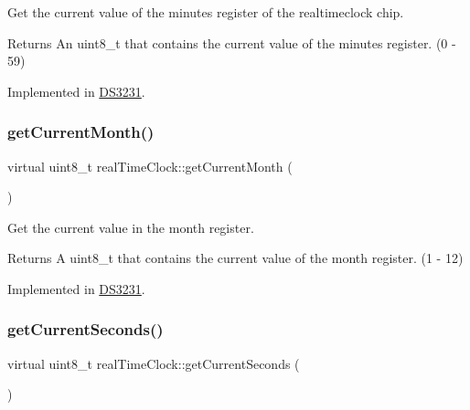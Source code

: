 Get the current value of the minutes register of the realtimeclock chip. 

\begin{DoxyReturn}{Returns}
An uint8\+\_\+t that contains the current value of the minutes register. (0 -\/ 59) 
\end{DoxyReturn}


Implemented in \mbox{\hyperlink{class_d_s3231_a08f384e1897214d4a201aaaecde3b8a4}{D\+S3231}}.

\mbox{\label{classreal_time_clock_a24dd15babb345129fd995641946c5f2b}} 
\subsubsection{\texorpdfstring{get\+Current\+Month()}{getCurrentMonth()}}
{\footnotesize\ttfamily virtual uint8\+\_\+t real\+Time\+Clock\+::get\+Current\+Month (\begin{DoxyParamCaption}{ }\end{DoxyParamCaption})\hspace{0.3cm}{\ttfamily [pure virtual]}}



Get the current value in the month register. 

\begin{DoxyReturn}{Returns}
A uint8\+\_\+t that contains the current value of the month register. (1 -\/ 12) 
\end{DoxyReturn}


Implemented in \mbox{\hyperlink{class_d_s3231_a8d7a965802afacc16b4d5af86e0ed11e}{D\+S3231}}.

\mbox{\label{classreal_time_clock_a46bfe69dc650cc27e648ac7adb03afd0}} 
\subsubsection{\texorpdfstring{get\+Current\+Seconds()}{getCurrentSeconds()}}
{\footnotesize\ttfamily virtual uint8\+\_\+t real\+Time\+Clock\+::get\+Current\+Seconds (\begin{DoxyParamCaption}{ }\end{DoxyParamCaption})\hspace{0.3cm}{\ttfamily [pure virtual]}}



